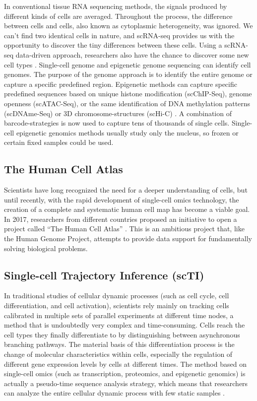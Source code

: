 In conventional tissue RNA sequencing methods, the signals produced by different kinds of cells are averaged. Throughout the process, the difference between cells and cells, also known as cytoplasmic heterogeneity, was ignored. We can't find two identical cells in nature, and scRNA-seq provides us with the opportunity to discover the tiny differences between these cells. Using a scRNA-seq data-driven approach, researchers also have the chance to discover some new cell types \parencite{regev_human_2017}. Single-cell genome and epigenetic genome sequencing can identify cell genomes. The purpose of the genome approach is to identify the entire genome or capture a specific predefined region. Epigenetic methods can capture specific predefined sequences based on unique histone modification (scChIP-Seq), genome openness (scATAC-Seq), or the same identification of DNA methylation patterns (scDNAme-Seq) or 3D chromosome-structures (scHi-C) \parencite{nowogrodzki_how_2017}. A combination of barcode-strategies is now used to capture tens of thousands of single cells. Single-cell epigenetic genomics methods usually study only the nucleus, so frozen or certain fixed samples could be used. 
 
\subsection{The Human Cell Atlas}

Scientists have long recognized the need for a deeper understanding of cells, but until recently, with the rapid development of single-cell omics technology, the creation of a complete and systematic human cell map has become a viable goal. In 2017, researchers from different countries proposed an initiative to open a project called ``The Human Cell Atlas'' 
\parencite{regev_human_2017}. This is an ambitious project that, like the Human Genome Project, attempts to provide data support for fundamentally solving biological problems. 

\subsection{Single-cell Trajectory Inference (scTI)}

In traditional studies of cellular dynamic processes (such as cell cycle, cell differentiation, and cell activation), scientists rely mainly on tracking cells calibrated in multiple sets of parallel experiments at different time nodes, a method that is undoubtedly very complex and time-consuming. Cells reach the cell types they  finally differentiate to by distinguishing between asynchronous branching pathways. The material basis of this differentiation process is the change of molecular characteristics within cells, especially the regulation of different gene expression levels by cells at different times. The method based on single-cell omics (such as transcription, proteomics, and epigenetic genomics) is actually a pseudo-time sequence analysis strategy, which means that researchers can analyze the entire cellular dynamic process with few static samples \parencite{tanay_scaling_2017,etzrodt_quantitative_2014}. \\


